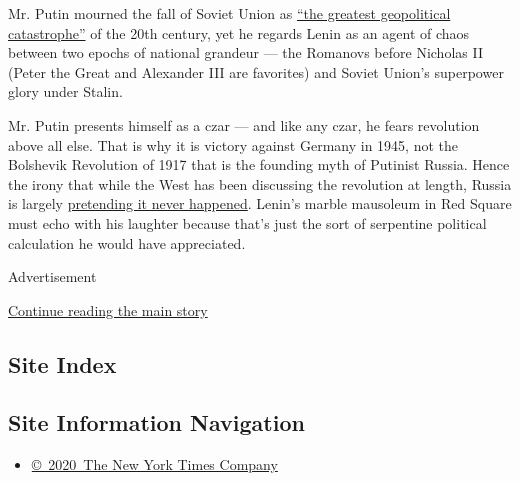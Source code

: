 Mr. Putin mourned the fall of Soviet Union as
\href{http://www.nbcnews.com/id/7632057/ns/world_news/t/putin-soviet-collapse-genuine-tragedy/\#.WfzGyBNSxmM}{``the
greatest geopolitical catastrophe''} of the 20th century, yet he regards
Lenin as an agent of chaos between two epochs of national grandeur ---
the Romanovs before Nicholas II (Peter the Great and Alexander III are
favorites) and Soviet Union's superpower glory under Stalin.

Mr. Putin presents himself as a czar --- and like any czar, he fears
revolution above all else. That is why it is victory against Germany in
1945, not the Bolshevik Revolution of 1917 that is the founding myth of
Putinist Russia. Hence the irony that while the West has been discussing
the revolution at length, Russia is largely
\href{https://www.theatlantic.com/international/archive/2017/04/russia-putin-revolution-lenin-nicholas-1917/521571/}{pretending
it never happened}. Lenin's marble mausoleum in Red Square must echo
with his laughter because that's just the sort of serpentine political
calculation he would have appreciated.

Advertisement

\protect\hyperlink{after-bottom}{Continue reading the main story}

\hypertarget{site-index}{%
\subsection{Site Index}\label{site-index}}

\hypertarget{site-information-navigation}{%
\subsection{Site Information
Navigation}\label{site-information-navigation}}

\begin{itemize}
\tightlist
\item
  \href{https://help.nytimes3xbfgragh.onion/hc/en-us/articles/115014792127-Copyright-notice}{©~2020~The
  New York Times Company}
\end{itemize}

